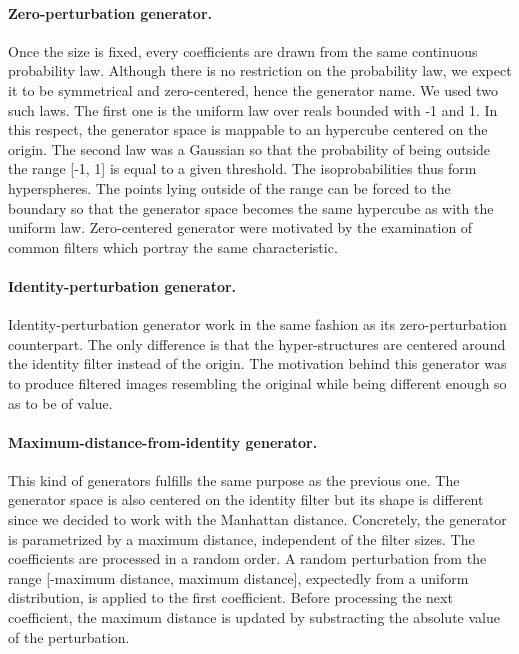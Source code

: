 \documentclass[a4paper]{report}
\begin{document}
			\paragraph{Zero-perturbation generator.}
			Once the size is fixed, every coefficients are drawn from the same continuous probability law. Although there is no restriction on the probability law, we expect it to be symmetrical and zero-centered, hence the generator name. We used two such laws. The first one is the uniform law over reals bounded with -1 and 1. In this respect, the generator space is mappable to an hypercube centered on the origin. The second law was a Gaussian so that the probability of being outside the range [-1, 1] is equal to a given threshold. The isoprobabilities thus form hyperspheres. The points lying outside of the range can be forced to the boundary so that the generator space becomes the same hypercube as with the uniform law. 
			Zero-centered generator were motivated by the examination of common filters which portray the same characteristic.
			\paragraph{Identity-perturbation generator.}
			Identity-perturbation generator work in the same fashion as its zero-perturbation counterpart. The only difference is that the hyper-structures are centered around the identity filter instead of the origin. 
			The motivation behind this generator was to produce filtered images resembling the original while being different enough so as to be of value.
			\paragraph{Maximum-distance-from-identity generator.} 
			This kind of generators fulfills the same purpose as the previous one. The generator space is also centered on the identity filter but its shape is different since we decided to work with the Manhattan distance. Concretely, the generator is parametrized by a maximum distance, independent of the filter sizes. The coefficients are processed in a random order. A random perturbation from the range [-maximum distance, maximum distance], expectedly from a uniform distribution, is applied to the first coefficient. Before processing the next coefficient, the maximum distance is updated by substracting the absolute value of the perturbation.
\end{document}
